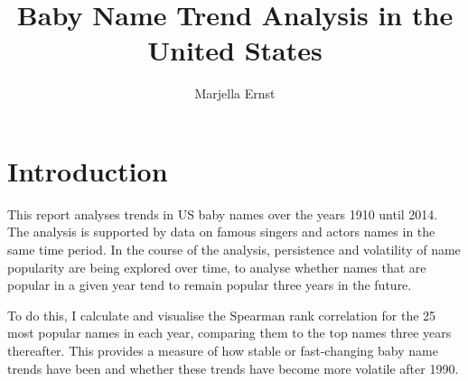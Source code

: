 \documentclass[11pt,preprint]{elsarticle}
\numberwithin{equation}{section}
\numberwithin{figure}{section}
\numberwithin{table}{section}
\begin{document}
\begin{frontmatter}  %

\title{Baby Name Trend Analysis in the United States}





\author[Add1]{Marjella Ernst}





\address[Add1]{Stellenbosch University, Stellenbosch, South Africa}



\vspace{1cm}





\vspace{0.5cm}

\end{frontmatter}

\setcounter{footnote}{0}



\pagestyle{fancy}
\chead{}
\rhead{}
\lfoot{}
\lhead{}
\cfoot{}


\headsep 35pt %




\section{\texorpdfstring{Introduction
\label{Introduction}}{Introduction }}\label{introduction}

This report analyses trends in US baby names over the years 1910 until
2014. The analysis is supported by data on famous singers and actors
names in the same time period. In the course of the analysis,
persistence and volatility of name popularity are being explored over
time, to analyse whether names that are popular in a given year tend to
remain popular three years in the future.

To do this, I calculate and visualise the Spearman rank correlation for
the 25 most popular names in each year, comparing them to the top names
three years thereafter. This provides a measure of how stable or
fast-changing baby name trends have been and whether these trends have
become more volatile after 1990.
\end{document}
